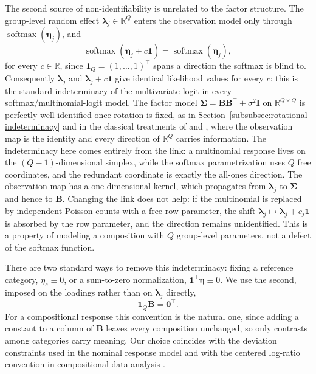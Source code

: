 The second source of non-identifiability is unrelated to the factor structure. The group-level random effect $\bm{\lambda}_j\in\mathbb{R}^Q$ enters the observation model only through $\operatorname{softmax}(\bm{\eta}_j)$, and
\begin{equation}
\operatorname{softmax}(\bm{\eta}_j+c\mathbf{1})=\operatorname{softmax}(\bm{\eta}_j),
\label{eq:softmax-invariance}
\end{equation}
for every $c\in\mathbb{R}$, since $\mathbf{1}_Q=(1,\ldots,1)^\top$ spans a direction the softmax is blind to. Consequently $\bm{\lambda}_j$ and $\bm{\lambda}_j+c\mathbf{1}$ give identical likelihood values for every $c$: this is the standard indeterminacy of the multivariate logit in every softmax/multinomial-logit model. The factor model $\bm{\Sigma}=\mathbf{B}\mathbf{B}^\top+\sigma^2\mathbf{I}$ on $\mathbb{R}^{Q\times Q}$ is perfectly well identified once rotation is fixed, as in Section~\ref{subsubsec:rotational-indeterminacy} and in the classical treatments of \citet{Rubin1982} and \citet{Tipping1999}, where the observation map is the identity and every direction of $\mathbb{R}^Q$ carries information. The indeterminacy here comes entirely from the link: a multinomial response lives on the $(Q-1)$-dimensional simplex, while the softmax parametrization uses $Q$ free coordinates, and the redundant coordinate is exactly the all-ones direction. The observation map has a one-dimensional kernel, which propagates from $\bm{\lambda}_j$ to $\bm{\Sigma}$ and hence to $\mathbf{B}$. Changing the link does not help: if the multinomial is replaced by independent Poisson counts with a free row parameter, the shift $\bm{\lambda}_j\mapsto\bm{\lambda}_j+c_j\mathbf{1}$ is absorbed by the row parameter, and the direction remains unidentified. This is a property of modeling a composition with $Q$ group-level parameters, not a defect of the softmax function.

There are two standard ways to remove this indeterminacy: fixing a reference category, $\eta_{s}\equiv0$, or a sum-to-zero normalization, $\mathbf{1}^\top\bm{\eta}\equiv0$. We use the second, imposed on the loadings rather than on $\bm{\lambda}_j$ directly,
\begin{equation}
\mathbf{1}_{Q}^{\top}\mathbf{B}=\mathbf{0}^{\top}.
\label{eq:gauge-constraint}
\end{equation}
For a compositional response this convention is the natural one, since adding a constant to a column of $\mathbf{B}$ leaves every composition unchanged, so only contrasts among categories carry meaning. Our choice coincides with the deviation constraints used in the nominal response model \citep{Bock1972} and with the centered log-ratio convention in compositional data analysis \citep{Aitchison1982,Aitchison1986}.

